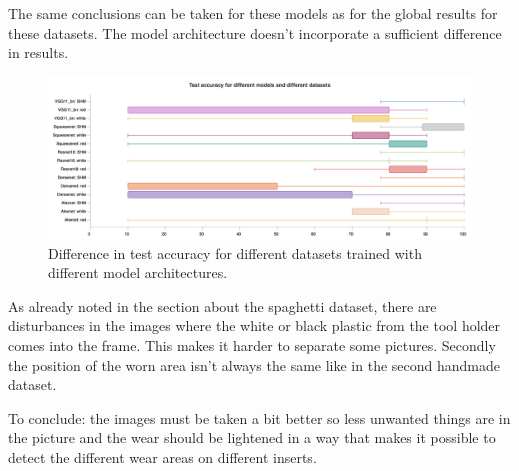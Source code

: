 	The same conclusions can be taken for these models as for the global results for these datasets. The model architecture doesn't incorporate a sufficient difference in results. 

	\begin{figure}[hbtp]
		\centering
		\includegraphics[width=\linewidth]{fig/results/wandb/spaghetti_vs_secondhandmade/charts/Section-4-Panel-0-u37bm4h79}
		\caption{Difference in test accuracy for different datasets trained with different model architectures.}
		\label{fig:res:comp:ta:arch}
	\end{figure}

As already noted in the section about the spaghetti dataset, there are disturbances in the images where the white or black plastic from the tool holder comes into the frame. This makes it harder to separate some pictures. Secondly the position of the worn area isn't always the same like in the second handmade dataset. 

To conclude: the images must be taken a bit better so less unwanted things are in the picture and the wear should be lightened in a way that makes it possible to detect the different wear areas on different inserts.

